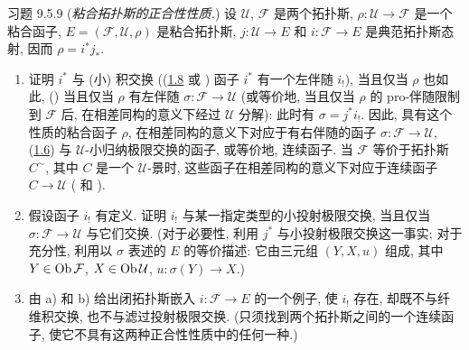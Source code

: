 

\begin{enonce*}[remark]{习题 9.5.9}
(\emph{粘合拓扑斯的正合性性质.})
设 $\mathcal{U}$, $\mathcal{F}$ 是两个拓扑斯,
$\rho:\mathcal{U}\rightarrow\mathcal{F}$ 是一个粘合函子,
$E=(\mathcal{F},\mathcal{U},\rho)$ 是粘合拓扑斯,
$j:\mathcal{U}\rightarrow E$ 和 $i:\mathcal{F}\rightarrow E$ 是典范拓扑斯态射,
因而 $\rho=i^{\ast}j_{\ast}$.
\begin{enumerate}
\renewcommand{\theenumi}{\alph{enumi}}
\renewcommand{\labelenumi}{\theenumi)}
\item 证明 $i^{\ast}$ 与 (小) 积交换
(\ie (\hyperref[IV.rem1.8]{1.8}
或 )
函子 $i^{\ast}$ 有一个左伴随 $i_{!}$),
当且仅当 $\rho$ 也如此,
\ie (\loccit) 当且仅当 $\rho$ 有左伴随
$\sigma:\mathcal{F}\rightarrow\mathcal{U}$
(或等价地, 当且仅当 $\rho$ 的 pro-伴随限制\pageoriginale 到 $\mathcal{F}$
 后,
在相差同构的意义下经过 $\mathcal{U}$ 分解):
此时有 $\sigma=j^{\ast}i_{!}$.
因此, 具有这个性质的粘合函子 $\rho$,
在相差同构的意义下对应于有右伴随的函子
$\sigma:\mathcal{F}\rightarrow\mathcal{U}$,
\ie (\hyperref[IV.cor1.6]{1.6}) 与 $𝒰$-小归纳极限交换的函子,
或等价地, 连续函子.
当 $\mathcal{F}$ 等价于拓扑斯 $C^{\sim}$,
其中 $C$ 是一个 $𝒰$-景时,
这些函子在相差同构的意义下对应于连续函子 $C\rightarrow\mathcal{U}$
( 和 ).

\item 假设函子 $i_{!}$ 有定义.
证明 $i_{!}$ 与某一指定类型的小投射极限交换,
当且仅当 $\sigma:\mathcal{F}\rightarrow\mathcal{U}$ 与它们交换.
(对于必要性, 利用 $j^{\ast}$ 与小投射极限交换这一事实;
对于充分性, 利用以 $\sigma$ 表述的 $E$ 的等价描述:
它由三元组 $(Y,X,u)$ 组成,
其中 $Y\in\operatorname{Ob}\mathcal{F}$, $X\in\operatorname{Ob}\mathcal{U}$,
$u:\sigma(Y)\rightarrow X$.)

\item 由 a) 和 b) 给出闭拓扑斯嵌入 $i:\mathcal{F}\rightarrow E$ 的一个例子,
使 $i_{!}$ 存在, 却既不与纤维积交换, 也不与滤过投射极限交换.
(只须找到两个拓扑斯之间的一个连续函子,
使它不具有这两种正合性性质中的任何一种.)
\end{enumerate}
\end{enonce*}

